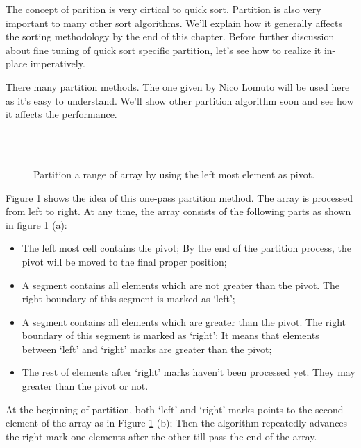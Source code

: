 \documentclass{article}
\begin{document}
The concept of parition is very cirtical to quick sort. Partition is also very important to many
other sort algorithms. We'll explain how it generally affects the sorting methodology by the end
of this chapter. Before further discussion about fine tuning of quick sort specific partition, let's
see how to realize it in-place imperatively.

There many partition methods. The one given by Nico Lomuto \cite{pearls} \cite{CLRS} will be used here as it's
easy to understand. We'll show other partition algorithm soon and see how it affects the performance.

\begin{figure}[htbp]
   \centering
    \\
    \\
   \caption{Partition a range of array by using the left most element as pivot.} 
   \label{fig:partition-1-way}
\end{figure}

Figure \ref{fig:partition-1-way} shows the idea of this one-pass partition method. The array is processed from
left to right. At any time, the array consists of the following parts as shown in figure \ref{fig:partition-1-way} (a): 

\begin{itemize}
\item The left most cell contains the pivot; By the end of the partition process, the pivot will be moved to the 
final proper position;
\item A segment contains all elements which are not greater than the pivot. The right boundary of this segment is
marked as `left';
\item A segment contains all elements which are greater than the pivot. The right boundary of this segment is marked
as `right'; It means that elements between `left' and `right' marks are greater than the pivot;
\item The rest of elements after `right' marks haven't been processed yet. They may greater than the
pivot or not.
\end{itemize}

At the beginning of partition, both `left' and `right' marks points to the second element of the array as in Figure
\ref{fig:partition-1-way} (b); Then the algorithm repeatedly advances the right mark one elements after the other
till pass the end of the array. 
\end{document}
